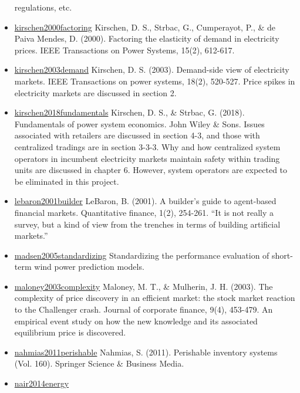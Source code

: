 \documentclass[letterpaper,8pt,twocolumn,twoside,]{pinp}
\begin{document}
\begin{itemize}
  regulations, etc.
\item
  \href{https://ieeexplore.ieee.org/document/867149}{kirschen2000factoring}
  Kirschen, D. S., Strbac, G., Cumperayot, P., \& de Paiva Mendes, D.
  (2000). Factoring the elasticity of demand in electricity prices. IEEE
  Transactions on Power Systems, 15(2), 612-617.
\item
  \href{https://ieeexplore.ieee.org/document/1198281}{kirschen2003demand}
  Kirschen, D. S. (2003). Demand-side view of electricity markets. IEEE
  Transactions on power systems, 18(2), 520-527. Price spikes in
  electricity markets are discussed in section 2.
\item
  \href{https://www.wiley.com/en-us/Fundamentals+of+Power+System+Economics\%2C+2nd+Edition-p-9781119213253}{kirschen2018fundamentals}
  Kirschen, D. S., \& Strbac, G. (2018). Fundamentals of power system
  economics. John Wiley \& Sons. Issues associated with retailers are
  discussed in section 4-3, and those with centralized tradings are in
  section 3-3-3. Why and how centralized system operators in incumbent
  electricity markets maintain safety within trading units are discussed
  in chapter 6. However, system operators are expected to be eliminated
  in this project.
\item
  \href{https://www.tandfonline.com/doi/abs/10.1088/1469-7688/1/2/307}{lebaron2001builder}
  LeBaron, B. (2001). A builder's guide to agent-based financial
  markets. Quantitative finance, 1(2), 254-261. ``It is not really a
  survey, but a kind of view from the trenches in terms of building
  artificial markets.''
\item
  \href{https://journals.sagepub.com/doi/abs/10.1260/030952405776234599}{madsen2005standardizing}
  Standardizing the performance evaluation of short-term wind power
  prediction models.
\item
  \href{https://www.sciencedirect.com/science/article/pii/S092911990200055X}{maloney2003complexity}
  Maloney, M. T., \& Mulherin, J. H. (2003). The complexity of price
  discovery in an efficient market: the stock market reaction to the
  Challenger crash. Journal of corporate finance, 9(4), 453-479. An
  empirical event study on how the new knowledge and its associated
  equilibrium price is discovered.
\item
  \href{https://www.springer.com/gp/book/9781441979988}{nahmias2011perishable}
  Nahmias, S. (2011). Perishable inventory systems (Vol. 160). Springer
  Science \& Business Media.
\item
  \href{https://dl.acm.org/doi/10.1145/2591971.2591982}{nair2014energy}

\end{itemize}
\end{document}
